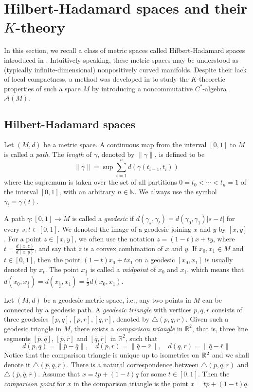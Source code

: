 \documentclass[11pt]{article}
\theoremstyle{definition}
\theoremstyle{plain}
\def\A{\mathcal A}\def\C{\mathcal C}\def\B{\mathcal B}\def\E{\mathcal E}\def\O{\mathcal O}\def\h{\mathfrak h}\def\K{\mathcal K}\def\F{\mathcal F}\def\P{\mathcal P}\def\L{\mathcal L}\def\R{\mathcal R}\def\Q{\mathcal Q}\def\H{\mathcal H}\def\S{\mathcal S}\def\N{\mathcal N}\def\U{\mathcal U}\def\V{\mathcal V}
\begin{document}
\section{Hilbert-Hadamard spaces and their $K$-theory}\label{sec: Hilbert-Hadamard spaces and their K-theory}

In this section, we recall a class of metric spaces called Hilbert-Hadamard spaces introduced in \cite{GWY2018}. 
Intuitively speaking, these metric spaces may be understood as (typically infinite-dimensional) nonpositively curved manifolds. 
Despite their lack of local compactness, a method was developed in \cite{GWY2018} to study the $K$-theoretic properties of such a space $M$ by introducing a noncommutative $C^*$-algebra $\A(M)$. 


\subsection{Hilbert-Hadamard spaces}\label{sec:Hilbert-Hadamard-spaces}

Let $(M,d)$ be a metric space. A continuous map from the interval $[0,1]$ to $M$ is called a \emph{path}. The \emph{length} of $\gamma$, denoted by $\|\gamma\|$, is defined to be
$$\|\gamma\|=\sup\sum_{i=1}^nd(\gamma(t_{i-1},t_i))$$
where the supremum is taken over the set of all partitions $0=t_0< \cdots < t_n = 1$ of the interval $[0,1]$, with an arbitrary $n\in\mathbb{N}$. We always use the symbol $\gamma_t=\gamma(t)$.

A path $\gamma:[0,1]\to M$ is called a \emph{geodesic} if $d(\gamma_s,\gamma_t)=d(\gamma_0,\gamma_1)|s-t|$ for every $s,t\in [0,1]$. We denoted the image of a geodesic joining $x$ and $y$ by $[x,y]$.  For a point $z\in[x,y]$, we often use the notation $z=(1-t)x+ty$, where $t=\frac{d(x,z)}{d(x,y)}$, and say that $z$ is a convex combination of $x$ and $y$. If $x_0,x_1\in M$ and $t\in [0,1]$, then the point $(1-t)x_0+tx_1$ on a geodesic $[x_0,x_1]$ is usually denoted by $x_t$. The point $x_{\frac 12}$ is called a \emph{midpoint} of $x_0$ and $x_1$, which means that $d(x_0,x_{\frac12})=d(x_{\frac12},x_1)=\frac12d(x_0,x_1)$.

Let $(M,d)$ be a geodesic metric space, i.e., any two points in $M$ can be connected by a geodesic path. A \emph{geodesic triangle} with vertices $p,q,r$ consists of three geodesics $[p,q], [p,r], [q,r]$, denoted by $\triangle(p,q,r)$. Given such a geodesic triangle in $M$, there exists a \emph{comparison triangle} in $\mathbb{R}^2$, that is, three line segments $[\bar p,\bar q]$, $[\bar p,\bar r]$ and $[\bar q,\bar r]$ in $\mathbb{R}^2$, such that
$$d(p,q)=\|\bar p-\bar q\|,\quad d(p,r)=\|\bar q-\bar r\|,\quad d(q,r)=\|\bar q-\bar r\|$$
Notice that the comparison triangle is unique up to isometries on $\mathbb R^2$ and we shall denote it $\triangle(\bar p,\bar q,\bar r)$. There is a natural correspondence between $\triangle(p,q,r)$ and $\triangle(\bar p,\bar q,\bar r)$. Assume that $x=tp+(1-t)q$ for some $t\in[0,1]$. Then the \emph{comparison point} for $x$ in the comparison triangle is the point $\bar x=t\bar p+(1-t)\bar q$.
\end{document}
